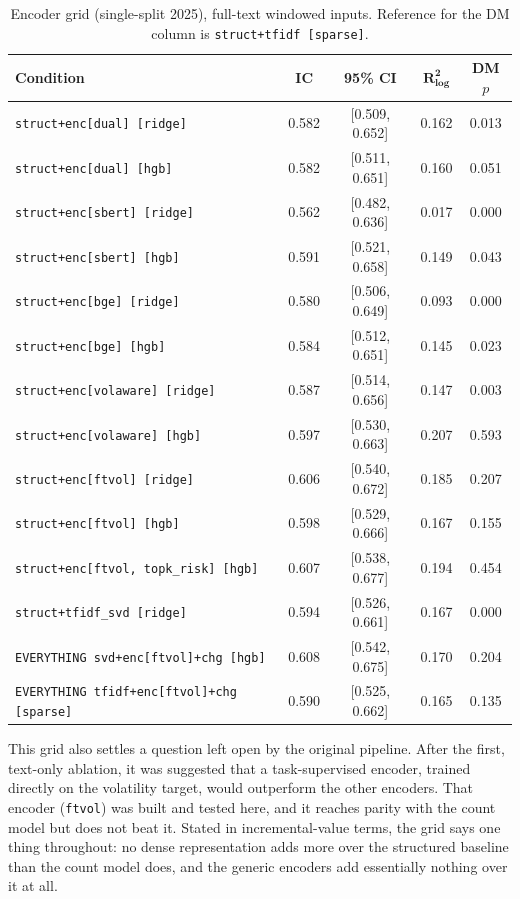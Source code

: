\documentclass[logo,msc,ai]{infthesis}        %
\begin{document}
\begin{table}[h]
\centering
\footnotesize
\caption{Encoder grid (single-split 2025), full-text windowed inputs. Reference for the DM column is \texttt{struct+tfidf [sparse]}.}
\label{tab:encgrid}
\begin{tabular}{@{}L{6.6cm}cccc@{}}
\toprule
\textbf{Condition} & \textbf{IC} & \textbf{95\% CI} & $\mathbf{R^2_{\log}}$ & \textbf{DM $p$} \\
\midrule
\texttt{struct+enc[dual] [ridge]}      & 0.582 & [0.509, 0.652] & 0.162 & 0.013 \\
\texttt{struct+enc[dual] [hgb]}        & 0.582 & [0.511, 0.651] & 0.160 & 0.051 \\
\texttt{struct+enc[sbert] [ridge]}     & 0.562 & [0.482, 0.636] & 0.017 & 0.000 \\
\texttt{struct+enc[sbert] [hgb]}       & 0.591 & [0.521, 0.658] & 0.149 & 0.043 \\
\texttt{struct+enc[bge] [ridge]}       & 0.580 & [0.506, 0.649] & 0.093 & 0.000 \\
\texttt{struct+enc[bge] [hgb]}         & 0.584 & [0.512, 0.651] & 0.145 & 0.023 \\
\texttt{struct+enc[volaware] [ridge]}  & 0.587 & [0.514, 0.656] & 0.147 & 0.003 \\
\texttt{struct+enc[volaware] [hgb]}    & 0.597 & [0.530, 0.663] & 0.207 & 0.593 \\
\texttt{struct+enc[ftvol] [ridge]}     & 0.606 & [0.540, 0.672] & 0.185 & 0.207 \\
\texttt{struct+enc[ftvol] [hgb]}       & 0.598 & [0.529, 0.666] & 0.167 & 0.155 \\
\texttt{struct+enc[ftvol, topk\_risk] [hgb]} & 0.607 & [0.538, 0.677] & 0.194 & 0.454 \\
\texttt{struct+tfidf\_svd [ridge]}     & 0.594 & [0.526, 0.661] & 0.167 & 0.000 \\
\texttt{EVERYTHING svd+enc[ftvol]+chg [hgb]} & 0.608 & [0.542, 0.675] & 0.170 & 0.204 \\
\texttt{EVERYTHING tfidf+enc[ftvol]+chg [sparse]} & 0.590 & [0.525, 0.662] & 0.165 & 0.135 \\
\bottomrule
\end{tabular}
\end{table}

This grid also settles a question left open by the original pipeline. After the first, text-only ablation, it was suggested that a task-supervised encoder, trained directly on the volatility target, would outperform the other encoders. That encoder (\texttt{ftvol}) was built and tested here, and it reaches parity with the count model but does not beat it. Stated in incremental-value terms, the grid says one thing throughout: no dense representation adds more over the structured baseline than the count model does, and the generic encoders add essentially nothing over it at all.
\end{document}
